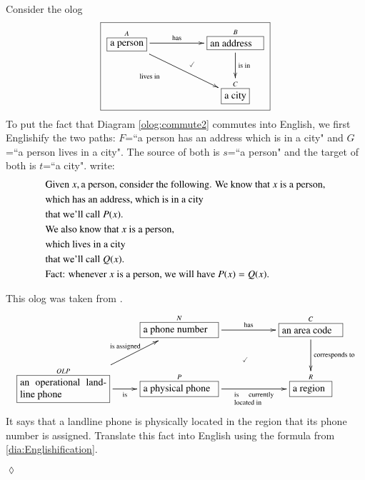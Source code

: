 \documentclass{book}
\def\tn{\textnormal}
\def\rr{\raggedright}
\newcommand{\LA}[2]{\ar[#1]^-{\tn {#2}}}
\newcommand{\LAL}[2]{\ar[#1]_-{\tn {#2}}}
\newcommand{\obox}[3]{\stackrel{#1}{\fbox{\parbox{#2}{#3}}}}
\newcommand{\smbox}[2]{\stackrel{#1}{\fbox{#2}}}
\theoremstyle{theoremENG}
\theoremstyle{lemmaENG}
\theoremstyle{propositionENG}
\theoremstyle{corollaryENG}
\theoremstyle{factENG}
\theoremstyle{remarkENG}
\theoremstyle{exampleENG}
\newtheorem{exampleENG}[subsubsection]{\begin{english}Example\end{english}}
\theoremstyle{warningENG}
\theoremstyle{questionENG}
\theoremstyle{guessENG}
\theoremstyle{answerENG}
\theoremstyle{constructionENG}
\theoremstyle{rulesENG}
\theoremstyle{excENG}
\newtheorem{excENG}[subsubsection]{\begin{english}Exercise\end{english}}
\theoremstyle{appENG}
\theoremstyle{definitionENG}
\theoremstyle{notationENG}
\theoremstyle{conjectureENG}
\theoremstyle{postulateENG}
\newenvironment{exerciseENG}{\begin{excENG}}{\hspace*{\fill}$\lozenge$\end{excENG}}
\theoremstyle{theoremRUS}
\theoremstyle{lemmaRUS}
\theoremstyle{propositionRUS}
\theoremstyle{corollaryRUS}
\theoremstyle{factRUS}
\theoremstyle{remarkRUS}
\theoremstyle{exampleRUS}
\theoremstyle{warningRUS}
\theoremstyle{questionRUS}
\theoremstyle{guessRUS}
\theoremstyle{answerRUS}
\theoremstyle{constructionRUS}
\theoremstyle{rulesRUS}
\theoremstyle{excRUS}
\theoremstyle{appRUS}
\theoremstyle{definitionRUS}
\theoremstyle{notationRUS}
\theoremstyle{conjectureRUS}
\theoremstyle{postulateRUS}
\begin{document}
\begin{english}
\begin{exampleENG}
Consider the olog
\begin{align}\label{olog:commute2}\fbox{\xymatrixnocompile{\smbox{A}{a person}\LA{rr}{has}\LAL{drr}{\parbox{.8in}{lives in}}&&\obox{B}{.7in}{\rr an address}\ar@{}[dll]|(.4){\checkmark}\LA{d}{is in}\\&&\smbox{C}{a city}}}
\end{align}
To put the fact that Diagram \ref{olog:commute2} commutes into English, we first Englishify the two paths: $F$=``a person has an address which is in a city" and $G$=``a person lives in a city". The source of both is $s$=``a person" and the target of both is $t$=``a city".
write:
\begin{align*}
&\tn{Given }x,\tn{a person, consider the following. We know that } x\tn{ is a person,}\\
&\tn{which has an address, which is in a city}\\
&\tn{that we'll call } P(x).\\
&\tn{We also know that }x\tn{ is a person,}\\
&\tn{which lives in a city}\\
&\tn{that we'll call } Q(x).\\
&\tn{Fact: whenever }x\tn{ is a person, we will have }P(x)=Q(x).
\end{align*}

\begin{russian} \end{russian}

\end{exampleENG}

\begin{exerciseENG}

This olog was taken from \cite{Sp1}.
\begin{align}\label{dia:phone paths}\xymatrix{&\obox{N}{1in}{a phone number}\LA{rr}{has}&&\obox{C}{.8in}{an area code}\ar@{}[dll]|{\checkmark}\LA{d}{corresponds to}\\\obox{OLP}{1.2in}{an operational landline phone}\LA{ru}{is assigned}\LAL{r}{is}&\obox{P}{1in}{a physical phone}\LAL{rr}{\parbox{.55in}{\scriptsize is currently located in}}&&\obox{R}{.5in}{a region}}
\end{align} 
It says that a landline phone is physically located in the region that its phone number is assigned. Translate this fact into English using the formula from \ref{dia:Englishification}.

\begin{russian} \end{russian}


\end{exerciseENG}
\end{english}
\end{document}
